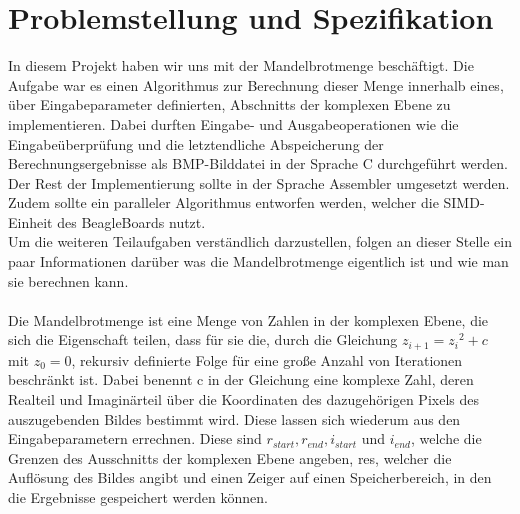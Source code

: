 \documentclass[11pt]{scrartcl}
\begin{document}
\section{Problemstellung und Spezifikation}
In diesem Projekt haben wir uns mit der Mandelbrotmenge beschäftigt.
Die Aufgabe war es einen Algorithmus zur Berechnung dieser Menge innerhalb eines, über Eingabeparameter definierten, Abschnitts der komplexen Ebene zu implementieren. Dabei durften Eingabe- und Ausgabeoperationen wie die Eingabeüberprüfung und die letztendliche Abspeicherung der Berechnungsergebnisse als BMP-Bilddatei in der Sprache C durchgeführt werden. Der Rest der Implementierung sollte in der Sprache Assembler umgesetzt werden.
Zudem sollte ein paralleler Algorithmus entworfen werden, welcher die SIMD-Einheit des BeagleBoards nutzt.\\
Um die weiteren Teilaufgaben verständlich darzustellen, folgen an dieser Stelle ein paar Informationen darüber was die Mandelbrotmenge eigentlich ist und wie man sie berechnen kann.\\
\\
Die Mandelbrotmenge ist eine Menge von Zahlen in der komplexen Ebene, die sich die Eigenschaft teilen, dass für sie die, durch die Gleichung $z_{i+1}={z_i}^2+c$\\ mit $z_0=0$, rekursiv definierte Folge für eine große Anzahl von Iterationen beschränkt ist.
Dabei benennt c in der Gleichung eine komplexe Zahl, deren Realteil und Imaginärteil über die Koordinaten des dazugehörigen Pixels des auszugebenden Bildes bestimmt wird. Diese lassen sich wiederum aus den Eingabeparametern errechnen. Diese sind $r_{start}, r_{end}, i_{start}$ und $i_{end}$, welche die Grenzen des Ausschnitts der komplexen Ebene angeben, res, welcher die Auflösung des Bildes angibt und einen Zeiger auf einen Speicherbereich, in den die Ergebnisse gespeichert werden können.
\end{document}
